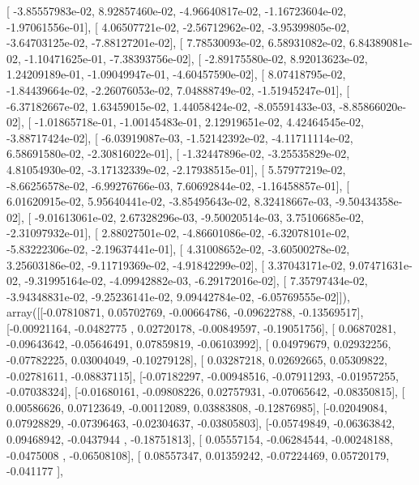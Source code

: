\documentclass{article}
\begin{document}
       [ -3.85557983e-02,   8.92857460e-02,  -4.96640817e-02,
         -1.16723604e-02,  -1.97061556e-01],
       [  4.06507721e-02,  -2.56712962e-02,  -3.95399805e-02,
         -3.64703125e-02,  -7.88127201e-02],
       [  7.78530093e-02,   6.58931082e-02,   6.84389081e-02,
         -1.10471625e-01,  -7.38393756e-02],
       [ -2.89175580e-02,   8.92013623e-02,   1.24209189e-01,
         -1.09049947e-01,  -4.60457590e-02],
       [  8.07418795e-02,  -1.84439664e-02,  -2.26076053e-02,
          7.04888749e-02,  -1.51945247e-01],
       [ -6.37182667e-02,   1.63459015e-02,   1.44058424e-02,
         -8.05591433e-03,  -8.85866020e-02],
       [ -1.01865718e-01,  -1.00145483e-01,   2.12919651e-02,
          4.42464545e-02,  -3.88717424e-02],
       [ -6.03919087e-03,  -1.52142392e-02,  -4.11711114e-02,
          6.58691580e-02,  -2.30816022e-01],
       [ -1.32447896e-02,  -3.25535829e-02,   4.81054930e-02,
         -3.17132339e-02,  -2.17938515e-01],
       [  5.57977219e-02,  -8.66256578e-02,  -6.99276766e-03,
          7.60692844e-02,  -1.16458857e-01],
       [  6.01620915e-02,   5.95640441e-02,  -3.85495643e-02,
          8.32418667e-03,  -9.50434358e-02],
       [ -9.01613061e-02,   2.67328296e-03,  -9.50020514e-03,
          3.75106685e-02,  -2.31097932e-01],
       [  2.88027501e-02,  -4.86601086e-02,  -6.32078101e-02,
         -5.83222306e-02,  -2.19637441e-01],
       [  4.31008652e-02,  -3.60500278e-02,   3.25603186e-02,
         -9.11719369e-02,  -4.91842299e-02],
       [  3.37043171e-02,   9.07471631e-02,  -9.31995164e-02,
         -4.09942882e-03,  -6.29172016e-02],
       [  7.35797434e-02,  -3.94348831e-02,  -9.25236141e-02,
          9.09442784e-02,  -6.05769555e-02]]), array([[-0.07810871,  0.05702769, -0.00664786, -0.09622788, -0.13569517],
       [-0.00921164, -0.0482775 ,  0.02720178, -0.00849597, -0.19051756],
       [ 0.06870281, -0.09643642, -0.05646491,  0.07859819, -0.06103992],
       [ 0.04979679,  0.02932256, -0.07782225,  0.03004049, -0.10279128],
       [ 0.03287218,  0.02692665,  0.05309822, -0.02781611, -0.08837115],
       [-0.07182297, -0.00948516, -0.07911293, -0.01957255, -0.07038324],
       [-0.01680161, -0.09808226,  0.02757931, -0.07065642, -0.08350815],
       [ 0.00586626,  0.07123649, -0.00112089,  0.03883808, -0.12876985],
       [-0.02049084,  0.07928829, -0.07396463, -0.02304637, -0.03805803],
       [-0.05749849, -0.06363842,  0.09468942, -0.0437944 , -0.18751813],
       [ 0.05557154, -0.06284544, -0.00248188, -0.0475008 , -0.06508108],
       [ 0.08557347,  0.01359242, -0.07224469,  0.05720179, -0.041177  ],
\end{document}
